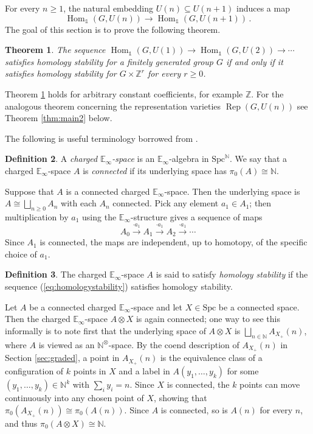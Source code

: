\documentclass[oneside, a4paper, 12pt]{article}
\numberwithin{equation}{section}
\DeclareMathOperator{\Rep}{Rep}
\DeclareMathOperator{\Hom}{Hom}
\newcommand{\Spc}{\mathrm{Spc}}
\newcommand{\Z}{\mathbb{Z}}
\newcommand{\N}{\mathbb{N}}
\theoremstyle{plain}
\newtheorem{theorem}{Theorem}[section]
\theoremstyle{definition}
\newtheorem{definition}[theorem]{Definition}
\theoremstyle{remark}
\begin{document}
For every $n\geq 1$, the natural embedding $U(n)\subseteq U(n+1)$ induces a map
\[
\Hom_{\mathds{1}}(G,U(n)) \to \Hom_{\mathds{1}}(G,U(n+1)) \,.
\]
The goal of this section is to prove the following theorem.

\begin{theorem} \label{thm:main1}
The sequence $\Hom_{\mathds{1}}(G,U(1)) \to \Hom_{\mathds{1}}(G,U(2)) \to \cdots$ satisfies homology stability for a finitely generated group $G$ if and only if it satisfies homology stability for $G\times \Z^r$ for every $r\geq 0$.
\end{theorem}

Theorem \ref{thm:main1} holds for arbitrary constant coefficients, for example $\Z$. For the analogous theorem concerning the representation varieties $\Rep(G,U(n))$ see Theorem \ref{thm:main2} below.

The following is useful terminology borrowed from \cite{KM18}.


\begin{definition} \label{def:chargedeinfinity}
A \emph{charged $\mathbb{E}_\infty$-space} is an $\mathbb{E}_\infty$-algebra in $\Spc^\N$. We say that a charged $\mathbb{E}_\infty$-space $A$ is \emph{connected} if its underlying space has $\pi_0(A)\cong \N$.
\end{definition}

Suppose that $A$ is a connected charged $\mathbb{E}_\infty$-space. Then the underlying space is $A\cong \bigsqcup_{n\geq 0} A_n$ with each $A_n$ connected. Pick any element $a_1\in A_1$; then multiplication by $a_1$ using the $\mathbb{E}_\infty$-structure gives a sequence of maps
\begin{equation} \label{eq:homologystability}
A_0\xrightarrow{\cdot a_1} A_1\xrightarrow{\cdot a_1} A_2\xrightarrow{\cdot a_1} \cdots
\end{equation}
Since $A_1$ is connected, the maps are independent, up to homotopy, of the specific choice of $a_1$.

\begin{definition}
The charged $\mathbb{E}_\infty$-space $A$ is said to satisfy \emph{homology stability} if the sequence (\ref{eq:homologystability}) satisfies homology stability.
\end{definition}

Let $A$ be a connected charged $\mathbb{E}_\infty$-space and let $X\in \Spc$ be a connected space. Then the charged $\mathbb{E}_\infty$-space $A\otimes X$ is again connected; one way to see this informally is to note first that the underlying space of $A\otimes X$ is $\bigsqcup_{n\in \N} A_{X_+}(n)$, where $A$ is viewed as an $\N^\otimes$-space. By the coend description of $A_{X_+}(n)$ in Section \ref{sec:graded}, a point in $A_{X_+}(n)$ is the equivalence class of a configuration of $k$ points in $X$ and a label in $A(y_1,\dots,y_k)$ for some $(y_1,\dots,y_k)\in \N^k$ with $\sum_{i} y_i=n$. Since $X$ is connected, the $k$ points can move continuously into any chosen point of $X$, showing that $\pi_0(A_{X_+}(n))\cong \pi_0(A(n))$. Since $A$ is connected, so is $A(n)$ for every $n$, and thus $\pi_0(A\otimes X)\cong \N$.
\end{document}
